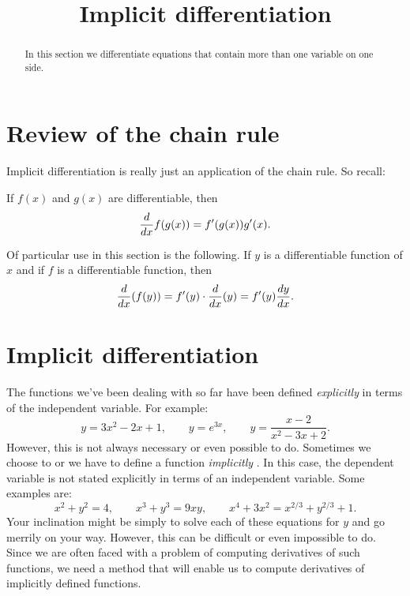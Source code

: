 \documentclass{ximera}
\title[Dig-In:]{Implicit differentiation}
\begin{document}
\begin{abstract}
In this section we differentiate equations that contain more than one variable on one side.
\end{abstract}
\maketitle
\section{Review of the chain rule}

Implicit differentiation is really just an application of the chain rule.
So recall:

\begin{theorem}
If $f(x)$ and $g(x)$ are differentiable, then
\[
\ddx f(g(x)) = f'(g(x))g'(x).
\]
\end{theorem}

Of particular use in this section is the following.
If $y$ is a differentiable function of $x$ and if $f$ is a differentiable function, then
\[
\ddx (f(y)) = f'(y) \cdot \ddx (y) = f'(y) \dd[y]{x}.
\]


\section{Implicit differentiation}

The functions we've been dealing with so far have been
defined \textit{explicitly}
 in terms of the independent
variable. For example:
\[
y=3x^2-2x+1,\qquad y=e^{3x}, \qquad y = \frac{x-2}{x^2-3x+2}.
\]
However, this is not always  necessary or even possible to do. Sometimes we choose to or we have to define a function  \textit{implicitly
 }. In this case, the dependent variable is not stated
explicitly in terms of an independent variable. Some examples are:
\[
x^2+y^2 = 4,\qquad x^3+y^3 = 9xy, \qquad x^4+3x^2 = x^{2/3}+y^{2/3} + 1.
\]
Your inclination might be simply to solve each of these equations for $y$ and go
merrily on your way. However, this can be difficult or even impossible to do.
Since we are often faced with a problem of computing derivatives of such functions,
we need a  method that will enable us to compute derivatives of implicitly defined functions.
\end{document}
